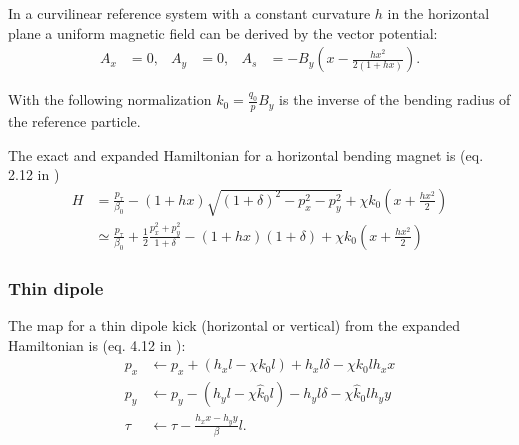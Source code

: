 In a curvilinear reference system with a constant curvature $h$ in the
horizontal plane a uniform magnetic field can be derived by the vector potential:
\begin{align}
  A_x & = 0, & A_y & = 0, & A_s & = 
  - B_y \left(x-\frac{h x^2}{2 (1+h x)}\right).
\end{align}

With the following normalization $k_0=\frac{q_0}{p} B_y$ is the inverse of the bending 
radius of the reference particle.

The exact and expanded Hamiltonian for a horizontal bending magnet is (eq. 2.12 in
\cite{barber87})
\begin{align}
  H &= \frac{p_\tau}{\beta_0} 
       - (1+h x)\sqrt{(1+\delta)^2 -p_x^2 - p_y^2}
       + \chi k_0 \left( x + \frac{h x^2}{2} \right)  \\
    &\simeq   \frac{p_\tau}{\beta_0}
    + \frac{1}{2}\frac{p_x^2+p_y^2}{1+\delta}
  - (1+h x) (1+\delta) + \chi k_0 \left( x + \frac{h x^2}{2} \right)
\end{align}


\subsubsection{Thin dipole}
The map for a thin dipole kick (horizontal or vertical) from the expanded Hamiltonian is 
(eq. 4.12 in \cite{heinemann95}):
\begin{align}
  p_x &\leftarrow p_x + (h_x l - \chi k_0 l)  + h_x l \delta - \chi k_0 l h_x x \\
  p_y &\leftarrow p_y - (h_y l - \chi \hat k_0 l) - h_y l \delta - \chi \hat k_0 l h_y y\\
  \tau &\leftarrow \tau - \frac{h_xx - h_yy}{\beta}  l.
\end{align}



%

